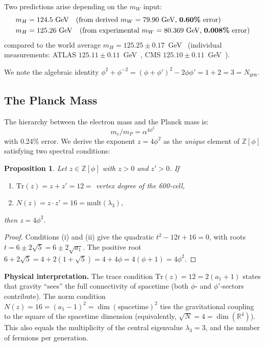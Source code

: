 \documentclass[12pt,a4paper]{article}
\newtheorem{proposition}{Proposition}
\theoremstyle{definition}
\begin{document}
Two predictions arise depending on the $m_W$ input:
\begin{align}
m_H &= 124.5\text{~GeV} \quad \text{(from derived } m_W = 79.90\text{~GeV, \textbf{0.60\%} error)} \notag \\
m_H &= 125.26\text{~GeV} \quad \text{(from experimental } m_W = 80.369\text{~GeV, \textbf{0.008\%} error)}
\end{align}
compared to the world average $m_H = 125.25 \pm 0.17$~GeV~\cite{pdg2024} (individual measurements: ATLAS $125.11 \pm 0.11$~GeV~\cite{atlas_higgs2023}, CMS $125.10 \pm 0.11$~GeV~\cite{cms_higgs2024}).

We note the algebraic identity $\phi^2 + \phi^{-2} = (\phi + \phi')^2 - 2\phi\phi' = 1 + 2 = 3 = N_{\text{gen}}$.

\subsection{The Planck Mass}

The hierarchy between the electron mass and the Planck mass is:
\begin{equation}
\boxed{m_e / m_P = \alpha^{4\phi^2}}
\label{eq:planck}
\end{equation}
with 0.24\% error. We derive the exponent $z = 4\phi^2$ as the \emph{unique} element of $\mathbb{Z}[\phi]$ satisfying two spectral conditions:

\begin{proposition}
Let $z \in \mathbb{Z}[\phi]$ with $z > 0$ and $z' > 0$. If
\begin{enumerate}
\item[(i)] $\mathrm{Tr}(z) = z + z' = 12 = $ vertex degree of the 600-cell,
\item[(ii)] $N(z) = z \cdot z' = 16 = \mathrm{mult}(\lambda_3)$,
\end{enumerate}
then $z = 4\phi^2$.
\end{proposition}

\begin{proof}
Conditions (i) and (ii) give the quadratic $t^2 - 12t + 16 = 0$, with roots $t = 6 \pm 2\sqrt{5} = 6 \pm 2\sqrt{a_1}$. The positive root $6 + 2\sqrt{5} = 4 + 2(1 + \sqrt{5}) = 4 + 4\phi = 4(\phi + 1) = 4\phi^2$.
\end{proof}

\textbf{Physical interpretation.} The trace condition $\text{Tr}(z) = 12 = 2(a_1+1)$ states that gravity ``sees'' the full connectivity of spacetime (both $\phi$- and $\phi'$-sectors contribute). The norm condition $N(z) = 16 = (a_1-1)^2 = \dim(\text{spacetime})^2$ ties the gravitational coupling to the square of the spacetime dimension (equivalently, $\sqrt{N} = 4 = \dim(\mathbb{R}^4)$). This also equals the multiplicity of the central eigenvalue $\lambda_3 = 3$, and the number of fermions per generation.
\end{document}
